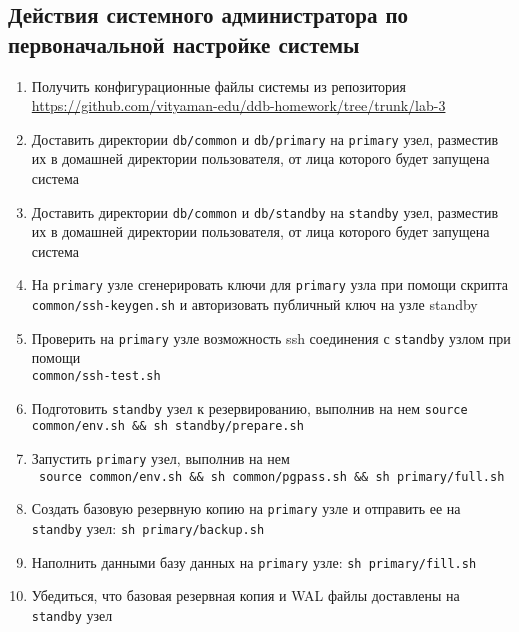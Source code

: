 \documentclass{article}
\begin{document}
\subsection{Действия системного администратора по первоначальной настройке системы}

\begin{enumerate}
    \item Получить конфигурационные файлы системы из репозитория \\
          \url{https://github.com/vityaman-edu/ddb-homework/tree/trunk/lab-3}

    \item Доставить директории \texttt{db/common} и \texttt{db/primary} на \texttt{primary} узел, разместив их в домашней директории пользователя, от лица которого будет запущена система

    \item Доставить директории \texttt{db/common} и \texttt{db/standby} на \texttt{standby} узел, разместив их в домашней директории пользователя, от лица которого будет запущена система

    \item На \texttt{primary} узле сгенерировать ключи для \texttt{primary} узла при помощи скрипта \\ \texttt{common/ssh-keygen.sh} и авторизовать публичный ключ на узле standby

    \item Проверить на \texttt{primary} узле возможность ssh соединения с \texttt{standby} узлом при помощи \\ \texttt{common/ssh-test.sh}

    \item Подготовить \texttt{standby} узел к резервированию, выполнив на нем \texttt{source common/env.sh \&\& sh standby/prepare.sh}

    \item Запустить \texttt{primary} узел, выполнив на нем \\
          \texttt{
              source common/env.sh \&\&
              sh common/pgpass.sh \&\&
              sh primary/full.sh}

    \item Создать базовую резервную копию на \texttt{primary} узле и отправить ее на \texttt{standby} узел: \texttt{sh primary/backup.sh}

    \item Наполнить данными базу данных на \texttt{primary} узле:
          \texttt{sh primary/fill.sh}

    \item Убедиться, что базовая резервная копия и WAL файлы доставлены на \texttt{standby} узел

\end{enumerate}
\end{document}
